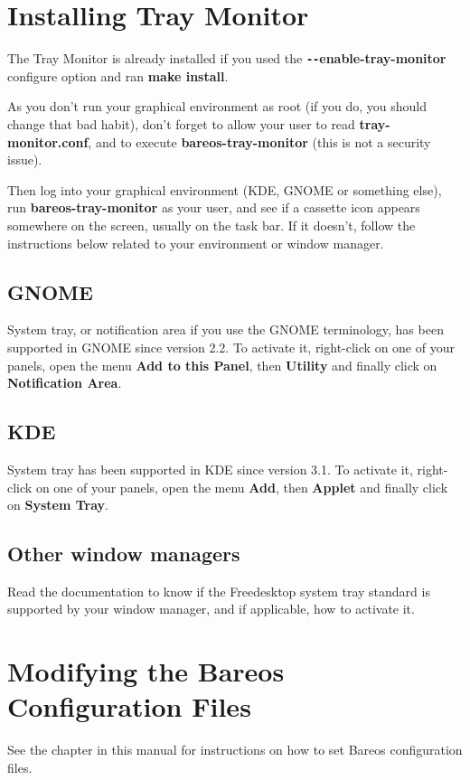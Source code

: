 \label{monitor}

\section{Installing Tray Monitor}

The Tray Monitor is already installed if you used the {\bf
\verb:--:enable-tray-monitor} configure option and ran {\bf make install}.

As you don't run your graphical environment as root (if you do, you should
change that bad habit), don't forget to allow your user to read {\bf
tray-monitor.conf}, and to execute {\bf bareos-tray-monitor} (this is not a
security issue).

Then log into your graphical environment (KDE, GNOME or something else), run
{\bf bareos-tray-monitor} as your user, and see if a cassette icon appears
somewhere on the screen, usually on the task bar.
If it doesn't, follow the instructions below related to your environment or
window manager.

\subsection{GNOME}

System tray, or notification area if you use the GNOME terminology, has been
supported in GNOME since version 2.2. To activate it, right-click on one of
your panels, open the menu {\bf Add to this Panel}, then {\bf Utility} and
finally click on {\bf Notification Area}.

\subsection{KDE}

System tray has been supported in KDE since version 3.1. To activate it,
right-click on one of your panels, open the menu {\bf Add}, then {\bf Applet}
and finally click on {\bf System Tray}.

\subsection{Other window managers}

Read the documentation to know if the Freedesktop system tray standard is
supported by your window manager, and if applicable, how to activate it.

\section{Modifying the Bareos Configuration Files}

See the chapter
 in this manual for
instructions on how to set Bareos configuration files.
